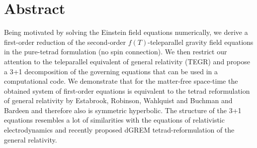 \documentclass[
10pt, %
a4paper, %
oneside, %
headinclude,footinclude, %
BCOR5mm, %
]{scrartcl}
\begin{document}
\section*{Abstract} %
Being motivated by solving the Einstein field equations numerically, we derive a first-order 
reduction of the second-order $ f(T) $-teleparallel gravity field 
equations 
in the pure-tetrad formulation (no spin connection). We then restrict our attention to the 
teleparallel equivalent of general relativity (TEGR) and propose a 3+1 decomposition of the governing 
equations that can be used in a computational code. We demonstrate that for the matter-free 
space-time the obtained system of first-order equations is equivalent to the tetrad reformulation 
of general relativity by Estabrook, Robinson, Wahlquist and Buchman and Bardeen and therefore also 
is symmetric 
hyperbolic. The structure of the 
3+1  equations 
resembles 
a lot of similarities with the equations of relativistic electrodynamics and recently proposed 
dGREM tetrad-reformulation of the general relativity. 
\renewcommand{\thefootnote}{\arabic{footnote}}
\end{document}
